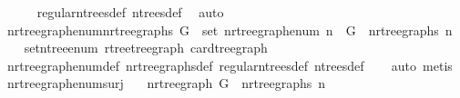 \begin{isabellebody}
\ \ \ \ \isamarkupfalse%
\ regular{\isacharunderscore}{\kern0pt}n{\isacharunderscore}{\kern0pt}trees{\isacharunderscore}{\kern0pt}def\ n{\isacharunderscore}{\kern0pt}trees{\isacharunderscore}{\kern0pt}def\ \isamarkupfalse%
\ auto\isanewline
{}\isamarkupfalse%
%
\endisatagproof
{\isafoldproof}%
%
\isadelimproof
\isanewline
%
\endisadelimproof
\isanewline
{}\isamarkupfalse%
\ n{\isacharunderscore}{\kern0pt}rtree{\isacharunderscore}{\kern0pt}graph{\isacharunderscore}{\kern0pt}enum{\isacharunderscore}{\kern0pt}n{\isacharunderscore}{\kern0pt}rtree{\isacharunderscore}{\kern0pt}graphs{\isacharcolon}{\kern0pt}\ {\isachardoublequoteopen}G\ {\isasymin}\ set\ {\isacharparenleft}{\kern0pt}n{\isacharunderscore}{\kern0pt}rtree{\isacharunderscore}{\kern0pt}graph{\isacharunderscore}{\kern0pt}enum\ n{\isacharparenright}{\kern0pt}\ {\isasymLongrightarrow}\ G\ {\isasymin}\ n{\isacharunderscore}{\kern0pt}rtree{\isacharunderscore}{\kern0pt}graphs\ n{\isachardoublequoteclose}\isanewline
%
\isadelimproof
\ \ %
\endisadelimproof
%
\isatagproof
{}\isamarkupfalse%
\ set{\isacharunderscore}{\kern0pt}n{\isacharunderscore}{\kern0pt}tree{\isacharunderscore}{\kern0pt}enum\ rtree{\isacharunderscore}{\kern0pt}tree{\isacharunderscore}{\kern0pt}graph\ card{\isacharunderscore}{\kern0pt}tree{\isacharunderscore}{\kern0pt}graph\isanewline
\ \ \isamarkupfalse%
\ n{\isacharunderscore}{\kern0pt}rtree{\isacharunderscore}{\kern0pt}graph{\isacharunderscore}{\kern0pt}enum{\isacharunderscore}{\kern0pt}def\ n{\isacharunderscore}{\kern0pt}rtree{\isacharunderscore}{\kern0pt}graphs{\isacharunderscore}{\kern0pt}def\ regular{\isacharunderscore}{\kern0pt}n{\isacharunderscore}{\kern0pt}trees{\isacharunderscore}{\kern0pt}def\ n{\isacharunderscore}{\kern0pt}trees{\isacharunderscore}{\kern0pt}def\isanewline
\ \ \isamarkupfalse%
\ {\isacharparenleft}{\kern0pt}auto{\isacharcomma}{\kern0pt}\ metis{\isacharparenright}{\kern0pt}%
\endisatagproof
{\isafoldproof}%
%
\isadelimproof
\isanewline
%
\endisadelimproof
\isanewline
{}\isamarkupfalse%
\ n{\isacharunderscore}{\kern0pt}rtree{\isacharunderscore}{\kern0pt}graph{\isacharunderscore}{\kern0pt}enum{\isacharunderscore}{\kern0pt}surj{\isacharcolon}{\kern0pt}\isanewline
\ \ \ n{\isacharunderscore}{\kern0pt}rtree{\isacharunderscore}{\kern0pt}graph{\isacharcolon}{\kern0pt}\ {\isachardoublequoteopen}G\ {\isasymin}\ n{\isacharunderscore}{\kern0pt}rtree{\isacharunderscore}{\kern0pt}graphs\ n{\isachardoublequoteclose}\isanewline

\end{isabellebody}
